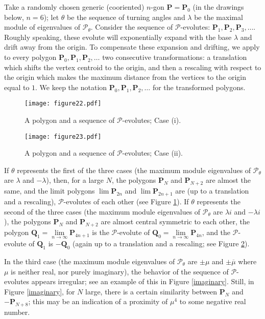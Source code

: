 \documentclass[12pt]{article}
\newcommand{\Pev}{\mathcal{P}}
\renewcommand{\P}{\mathbf{P}}
\begin{document}
Take a randomly chosen generic (cooriented) $n$-gon $\P=\P_0$ (in the drawings below, $n=6$); let $\theta$ be the sequence of turning angles and $\lambda$ be the maximal module of eigenvalues of $\Pev_\theta$. Consider the sequence of $\Pev$-evolutes:  $\P_1,\P_2,\P_3,\dots$. Roughly speaking, these evolute will exponentially expand with the base $\lambda$ and drift away from the origin. To compensate these expansion and drifting, we apply to every polygon $\P_0,\P_1,\P_2,\dots$ two consecutive transformations: a translation which shifts the vertex centroid to the origin, and then a rescaling with respect to the origin which makes the maximum distance from the vertices to the origin equal to $1$. We keep the notation $\P_0,\P_1,\P_2,\dots$ for the transformed polygons.

\begin{figure}[htbp]
\centering
\texttt{[image: figure22.pdf]}
\caption{A polygon and a sequence of $\Pev$-evolutes; Case (i).}
\label{positive}
\end{figure}

\begin{figure}[htbp]
\centering
\texttt{[image: figure23.pdf]}
\caption{A polygon and a sequence of $\Pev$-evolutes; Case (ii).}
\label{negative}
\end{figure}

If $\theta$ represents the first of the three cases (the maximum module eigenvalues of $\Pev_\theta$ are $\lambda$ and $-\lambda$), then, for a large $N$, the polygons $\P_N$ and $\P_{N+2}$ are almost the same, and the limit polygons $\lim\P_{2n}$ and $\lim\P_{2n+1}$ are (up to a translation and a rescaling), $\Pev$-evolutes of each other (see Figure \ref{positive}). If $\theta$ represents the second of the three cases (the maximum module eigenvalues of $\Pev_\theta$ are $\lambda i$ and $-\lambda i$), the polygons $\P_N$ and $\P_{N+2}$ are almost central symmetric to each other, the polygon $\mathbf{Q}_1=\lim\limits_{n\to\infty}\P_{4n+1}$ is the $\Pev$-evolute of $\mathbf{Q}_0=\lim\limits_{n\to\infty}\P_{4n}$, and the $\Pev$-evolute of $\mathbf{Q}_1$ is $-\mathbf{Q}_0$ (again up to a translation and a rescaling; see Figure \ref{negative}).

In the third case (the maximum module eigenvalues of $\Pev_\theta$ are $\pm\mu$ and $\pm\overline\mu$ where $\mu$ is neither real, nor purely imaginary), the behavior of the sequence of $\Pev$-evolutes appears irregular; see an example of this in Figure \ref{imaginary}. Still, in Figure \ref{imaginary}, for $N$ large, there is a certain similarity between $\P_N$ and $-\P_{N+8}$; this may be an indication of a proximity of $\mu^4$ to some negative real number.
\end{document}
